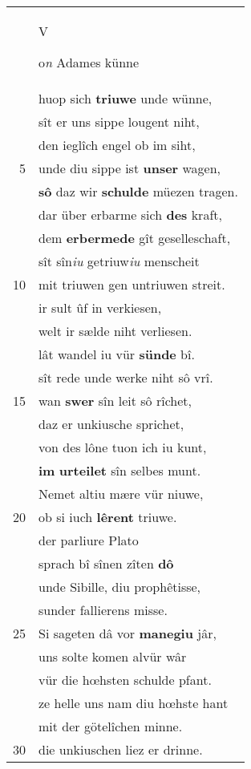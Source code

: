 \documentclass[8pt,a4paper,notitlepage]{article}
\begin{document}
\begin{table}[ht]
\begin{minipage}[t]{0.5\linewidth}
\begin{center}
\end{center}
\begin{tabular}{rl}
 & \begin{large}V\end{large}o\textit{n} Adames künne\\ 
 & huop sich \textbf{triuwe} unde wünne,\\ 
 & sît er uns sippe lougent niht,\\ 
 & den ieglîch engel ob im siht,\\ 
5 & unde diu sippe ist \textbf{unser} wagen,\\ 
 & \textbf{sô} daz wir \textbf{schulde} müezen tragen.\\ 
 & dar über erbarme sich \textbf{des} kraft,\\ 
 & dem \textbf{erbermede} gît geselleschaft,\\ 
 & sît sîn\textit{iu} getriuw\textit{iu} menscheit\\ 
10 & mit triuwen gen untriuwen streit.\\ 
 & ir sult ûf in verkiesen,\\ 
 & welt ir sælde niht verliesen.\\ 
 & lât wandel iu vür \textbf{sünde} bî.\\ 
 & sît rede unde werke niht sô vrî.\\ 
15 & wan \textbf{swer} sîn leit sô rîchet,\\ 
 & daz er unkiusche sprichet,\\ 
 & von des lône tuon ich iu kunt,\\ 
 & \textbf{im} \textbf{urteilet} sîn selbes munt.\\ 
 & Nemet altiu mære vür niuwe,\\ 
20 & ob si iuch \textbf{lêrent} triuwe.\\ 
 & der parliure Plato\\ 
 & sprach bî sînen zîten \textbf{dô}\\ 
 & unde Sibille, diu prophêtisse,\\ 
 & sunder fallierens misse.\\ 
25 & Si sageten dâ vor \textbf{manegiu} jâr,\\ 
 & uns solte komen alvür wâr\\ 
 & vür die hœhsten schulde pfant.\\ 
 & ze helle uns nam diu hœhste hant\\ 
 & mit der götelîchen minne.\\ 
30 & die unkiuschen liez er drinne.\\ 

\end{tabular}
\end{minipage}
\end{table}
\end{document}
